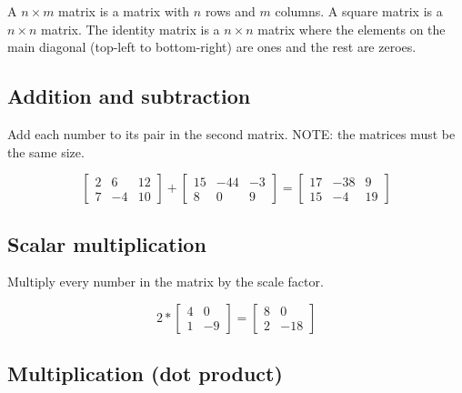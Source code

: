 
A $n \times m$ matrix is a matrix with $n$ rows and $m$ columns. A square matrix is a $n \times n$ matrix. The identity matrix is a $n \times n$ matrix where the elements on the main diagonal (top-left to bottom-right) are ones and the rest are zeroes.

\subsection*{Addition and subtraction}

Add each number to its pair in the second matrix. NOTE: the matrices must be the same size.

\begin{equation*}
    \begin{bmatrix}
        2 & 6 & 12 \\
        7 & -4 & 10
    \end{bmatrix}
    +
    \begin{bmatrix}
        15 & -44 & -3 \\
        8 & 0 & 9
    \end{bmatrix}
    =
    \begin{bmatrix}
        17 & -38 & 9 \\
        15 & -4 & 19
    \end{bmatrix}
\end{equation*}

\subsection*{Scalar multiplication}

Multiply every number in the matrix by the scale factor.

\begin{equation*}
    2 * 
    \begin{bmatrix}
        4 & 0 \\
        1 & -9
    \end{bmatrix}
    =
    \begin{bmatrix}
        8 & 0 \\
        2 & -18
    \end{bmatrix}
\end{equation*}

\subsection*{Multiplication (dot product)}

